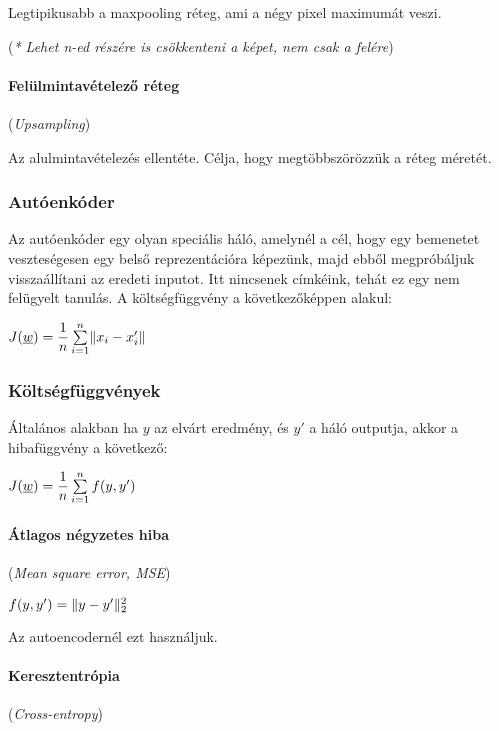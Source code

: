 Legtipikusabb a maxpooling réteg, ami a négy pixel maximumát veszi.

(\textit{* Lehet n-ed részére is csökkenteni a képet, nem csak a felére})

\paragraph{Felülmintavételező réteg} (\textit{Upsampling})

Az alulmintavételezés ellentéte. Célja, hogy megtöbbszörözzük a réteg
méretét.




\subsubsection{Autóenkóder}

Az autóenkóder egy olyan speciális háló, amelynél a cél, hogy 
egy bemenetet veszteségesen egy belső reprezentációra képezünk,
majd ebből megpróbáljuk visszaállítani az eredeti inputot.
Itt nincsenek címkéink, tehát ez egy nem felügyelt tanulás.
A költségfüggvény a következőképpen alakul:


$ J(\underline{w}) = \dfrac{1}{n} \sum\limits_{{i}=1}^{n}\lVert x_i - x_i'\rVert $




\subsubsection{Költségfüggvények}

Általános alakban ha $ y $ az elvárt eredmény, és $ y' $ a háló
outputja, akkor a hibafüggvény a következő:

$ J(\underline{w}) = \dfrac{1}{n} \sum\limits_{{i}=1}^{n} f(y, y') $


\paragraph{Átlagos négyzetes hiba} (\textit{Mean square error, MSE})


$ f(y, y') = \lVert y - y'\rVert_2^2 $

\noindent
Az autoencodernél ezt használjuk.


\paragraph{Keresztentrópia} (\textit{Cross-entropy})

